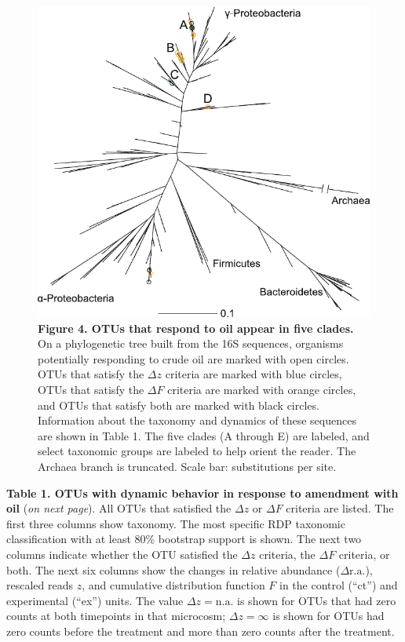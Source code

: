 \clearpage
\begin{figure}
\centering
\includegraphics{texmex/fig/fig_4}
\caption*{{\bf Figure 4. OTUs that respond to oil appear in five clades.}
On a phylogenetic tree built from the 16S sequences, organisms potentially
responding to crude oil are marked with open circles. OTUs that satisfy the $\Delta z$
criteria are marked with blue circles, OTUs that satisfy the $\Delta F$ criteria are
marked with orange circles, and OTUs that satisfy both are marked with black
circles. Information about the taxonomy and dynamics of these sequences are
shown in Table 1. The five clades (A through E) are labeled, and select
taxonomic groups are labeled to help orient the reader. The Archaea branch is
truncated. Scale bar: substitutions per site.}
\end{figure}

\clearpage
\begin{table}
\caption*{{\bf Table 1. OTUs with dynamic behavior in response to amendment with oil}
(\textit{on next page}).
All OTUs that satisfied the $\Delta z$ or $\Delta F$ criteria are listed. The first
three columns show taxonomy. The most specific RDP taxonomic
classification with at least 80\% bootstrap support is shown. The next
two columns indicate whether the OTU satisfied the $\Delta z$ criteria, the $\Delta F$
criteria, or both. The next six columns show the changes in relative
abundance ($\Delta \mathrm{r.a.}$), rescaled reads $z$, and cumulative distribution
function $F$ in the control (``ct'') and experimental (``ex'') units. The
value $\Delta z = \mathrm{n.a.}$ is shown for OTUs that had zero counts at both
timepoints in that microcosm; $\Delta z = \infty$ is shown for OTUs had zero counts
before the treatment and more than zero counts after the treatment.}
\end{table}

